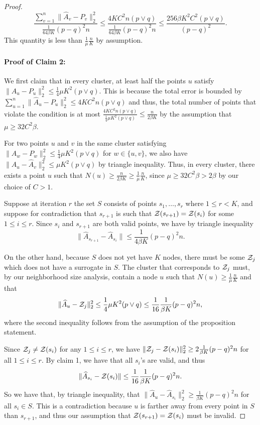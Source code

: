 \documentclass{article}
\begin{document}
\begin{proof}
\[
\frac{\sum_{v=1}^n \| \hat{A}_v - P_v \|_2^2}{ \frac{1}{64 \beta K} (p-q)^2 n } \leq 
        \frac{ 4 K C^2 n (p \vee q)}{ \frac{1}{64 \beta K} (p-q)^2 n} \leq \frac{256 \beta K^2 C^2 (p \vee q)}{(p-q)^2}. 
\]
This quantity is less than $\frac{1}{\mu} \frac{n}{K}$ by assumption.

\paragraph{\textbf{Proof of Claim 2:}} We first claim that in every cluster, at least half the points $u$ satisfy $\| \hat{A}_u - P_u \|_2^2 \leq \frac{1}{4} \mu K^2 (p \vee q)$. This is because the total error is bounded by $\sum_{u=1}^n \| \hat{A}_u - P_u \|_2^2 \leq 4 K C^2 n (p \vee q)$ and thus, the total number of points that violate the condition is at most $\frac{ 4 K C^2 n (p \vee q)}{ \frac{1}{4} \mu K^2 (p \vee q)} \leq \frac{n}{2 \beta K}$ by the assumption that $\mu \geq 32 C^2 \beta$. 

For two points $u$ and $v$ in the same cluster satisfying $\| \hat{A}_w - P_w \|_2^2 \leq  \frac{1}{4} \mu K^2 (p \vee q)$ for $w \in \{u,v\}$, we also have $\| \hat{A}_u - \hat{A}_v \|_2^2 \leq \mu K^2 (p \vee q)$ by triangle inequality. Thus, in every cluster, there exists a point $u$ such that $N(u) \geq \frac{n}{2\beta K} \geq \frac{1}{\mu} \frac{n}{K}$, since $\mu \geq 32C^2\beta > 2\beta$ by our choice of $C > 1$.

Suppose at iteration $r$ the set $S$ consists of points $s_1, \dots, s_r$ where $1 \leq r < K$, and suppose for contradiction that $s_{r+1}$ is such that ${\cal Z}(s_{r+1}) = {\cal Z}(s_i)$ for some $1 \leq i \leq r$. Since $s_i$ and $s_{r+1}$ are both valid points, we have by triangle inequality
$$\| \hat A_{s_{r+1}} - \hat A_{s_i} \| \leq \frac{1}{4 \beta K} (p - q)^2 n.$$

On the other hand, because $S$ does not yet have $K$ nodes, there must be some ${\cal Z}_j$ which does not have a surrogate in $S$. The cluster that corresponds to ${\cal Z}_j$ must, by our neighborhood size analysis, 
contain a node $u$ such that $N(u) \geq \frac{1}{\mu} \frac{n}{K}$ and that
\[
\| \hat{A}_u - {\cal Z}_j \|_2^2 \leq \frac{1}{4} \mu K^2 (p \vee q)  \leq \frac{1}{16} \frac{1}{\beta K} (p-q)^2 n,
\]
where the second inequality follows from the assumption of the proposition statement.

Since ${\cal Z}_j \neq {\cal Z}(s_i)$ for any $1 \leq i \leq r$, we have $\| {\cal Z}_j - {\cal Z}(s_i) \|_2^2 \geq 2 \frac{1}{\beta K} (p-q)^2 n$ for all $1 \leq i \leq r$. By claim 1, we have that all $s_i$'s are valid, and thus
$$\| \hat{A}_{s_i} - {\cal Z}(s_i) \| \leq \frac{1}{16} \frac{1}{\beta K} (p - q)^2 n.$$ 
So we have that, by triangle inequality, that $\| \hat{A}_u - \hat{A}_{s_i} \|_2^2 \geq \frac{1}{\beta K} (p - q)^2 n$ for all $s_i \in S$. This is a contradiction because $u$ is farther away from every point in $S$ than $s_{r+1}$, and thus our assumption that ${\cal Z}(s_{r+1}) =  {\cal Z}(s_i)$ must be invalid.
\end{proof}
\end{document}
